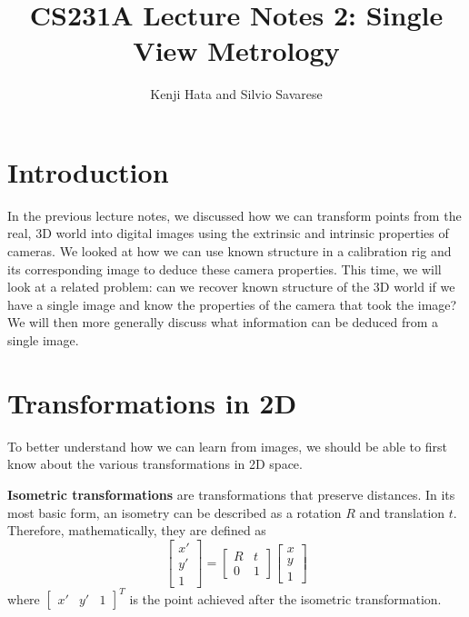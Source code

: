 \documentclass[a4paper, 12pt]{article}
\title{CS231A Lecture Notes 2: Single View Metrology}
\author{Kenji Hata and Silvio Savarese}
\date{}
\renewcommand\emph{\textbf}
\begin{document}
\maketitle

\section{Introduction}
In the previous lecture notes, we discussed how we can transform points from the real, 3D world into digital images using the extrinsic and intrinsic properties of cameras. We looked at how we can use known structure in a calibration rig and its corresponding image to deduce these camera properties. This time, we will look at a related problem: can we recover known structure of the 3D world if we have a single image and know the properties of the camera that took the image? We will then more generally discuss what information can be deduced from a single image.

\section{Transformations in 2D}
To better understand how we can learn from images, we should be able to first know about the various transformations in 2D space. 

\emph{Isometric transformations} are transformations that preserve distances. In its most basic form, an isometry can be described as a rotation $R$  and translation $t$. Therefore, mathematically, they are defined as
\begin{equation*}
    \begin{bmatrix}x'\\y'\\1\end{bmatrix} = \begin{bmatrix}R & t\\ 0 & 1\end{bmatrix}\begin{bmatrix}x\\y\\1\end{bmatrix}
\end{equation*}
where $\begin{bmatrix}x'&y'&1\end{bmatrix}^T$ is the point achieved after the isometric transformation. 
\end{document}
